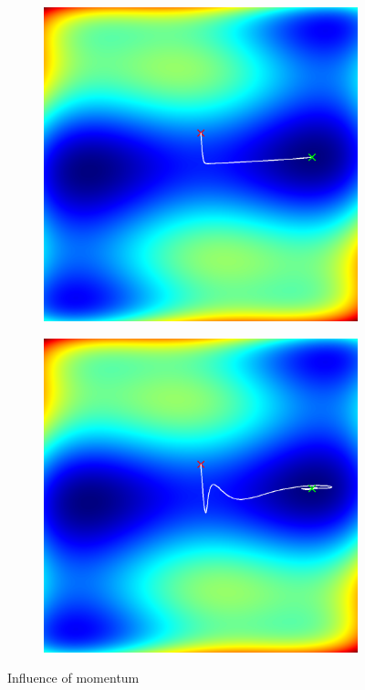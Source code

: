 \documentclass[sigconf,nonacm]{acmart}
\begin{document}
\begin{figure}[ht]
\begin{subfigure}[c]{0.45\columnwidth}
\includegraphics[width=\textwidth]{sgd-camel-nomomentum.png}
\end{subfigure}
\begin{subfigure}[c]{0.45\columnwidth}
\includegraphics[width=\textwidth]{sgd-camel-momentum.png}
\end{subfigure}
\caption{Influence of momentum}
\label{p1:momentum}
\end{figure}
\end{document}
